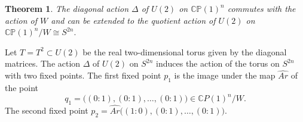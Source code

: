 \documentclass[11pt]{amsart}
\newtheorem{theorem}{Theorem}[section]
\newtheorem{prop}[theorem]{Proposition}
\theoremstyle{definition}
\theoremstyle{remark}
\numberwithin{equation}{section}
\newcommand{\CP}{\mathbb{CP}}
\begin{document}
\begin{theorem}\label{second}
    The diagonal action $\Delta$ of $U(2)$ on $\CP(1)^n$ commutes with the action of $W$ and can be extended to the quotient action of $U(2)$ on $\CP(1)^n/W \cong S^{2n}.$
\end{theorem}

Let $T=T^2 \subset U(2)$ be the real two-dimensional torus given by the diagonal matrices. The action $\Delta$ of $U(2)$ on $S^{2n}$ induces the action of the torus on $S^{2n}$ with two fixed points. The first fixed point $p_1$
is the image under the map $\widehat{Ar}$  of the point 
\[
q_1=\big((0:1), (0:1), \ldots, (0:1)\big)\in \mathbb CP(1)^n/W.
\]
The second fixed point $p_2 = \widehat{Ar}\big((1:0), (0:1), \ldots, (0:1) \big).$

\end{document}
